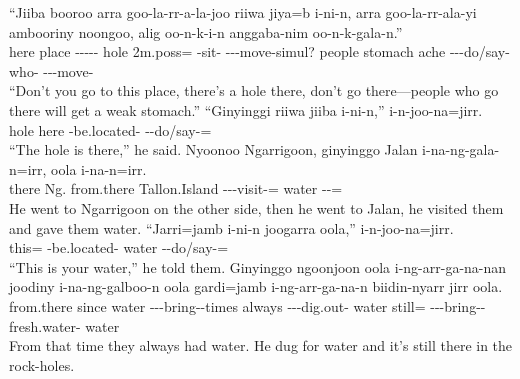 \begin{exye}
\gll ``Jiiba booroo arra goo-la-rr-a-la-joo riiwa jiya=b i-ni-n, arra goo-la-rr-ala-yi ambooriny noongoo, alig oo-n-k-i-n anggaba-nim oo-n-k-gala-n.''\\
here place  ----- hole 2m.poss= -sit-  ---move-simul? people stomach ache ---do/say- who- ---move-\\
\ft ``Don't you go to this place, there's a hole there, don't go there---people who go there will get a weak stomach.''
\exy {}
\gll ``Ginyinggi riiwa jiiba i-ni-n,'' i-n-joo-na=jirr.\\
 hole here -be.located- --do/say-=\\
\ft ``The hole is there,'' he said.
\exy {}
\gll Nyoonoo Ngarrigoon, ginyinggo Jalan i-na-ng-gala-n=irr, oola i-na-n=irr.\\
there Ng. from.there Tallon.Island ---visit-= water --=\\
\ft He went to Ngarrigoon on the other side, then he went to Jalan, he visited them and gave them water.
\exy {}
\gll ``Jarri=jamb i-ni-n joogarra oola,'' i-n-joo-na=jirr.\\
this= -be.located-  water --do/say-=\\
\ft ``This is your water,'' he told them.
\exy {}
\gll Ginyinggo ngoonjoon oola i-ng-arr-ga-na-nan joodiny i-na-ng-galboo-n oola gardi=jamb i-ng-arr-ga-na-n biidin-nyarr jirr oola.\\
from.there since water ---bring--times always ---dig.out- water still= ---bring-- fresh.water-  water\\
\ft From that time they always had water. He dug for water and it's still there in the rock-holes.
\exy {}

\end{exye}
